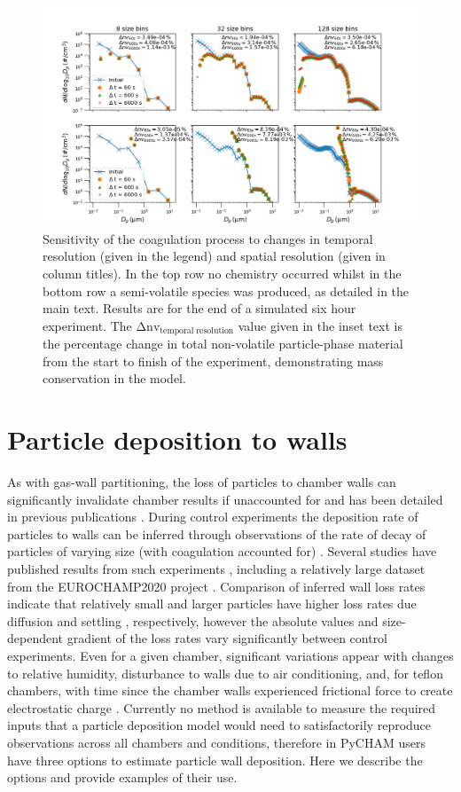 \documentclass[gmd, manuscript]{copernicus}
\begin{document}
\begin{figure}[t]
\includegraphics[width=12.0cm]{Results/coag_resol_test_plot.png}
\caption{Sensitivity of the coagulation process to changes in temporal resolution (given in the legend) and spatial resolution (given in column titles).  In the top row no chemistry occurred whilst in the bottom row a semi-volatile species was produced, as detailed in the main text.  Results are for the end of a simulated six hour experiment.  The $\mathrm{\Delta nv_{temporal\; resolution}}$ value given in the inset text is the percentage change in total non-volatile particle-phase material from the start to finish of the experiment, demonstrating mass conservation in the model.}
\label{fig:coag_resol_test_plot}
\end{figure}

\section{Particle deposition to walls}\label{sec:part2wall}

As with gas-wall partitioning, the loss of particles to chamber walls can significantly invalidate chamber results if unaccounted for and has been detailed in previous publications \citep{Crump1981, McMurry1985, Nah2017, Wang2018}.  During control experiments the deposition rate of particles to walls can be inferred through observations of the rate of decay of particles of varying size (with coagulation accounted for) \citep{Charan2019}.  Several studies have published results from such experiments \citep{McMurry1985, Wang2018}, including a relatively large dataset from the EUROCHAMP2020 project \citep{EUROCHAMP2020}.  Comparison of inferred wall loss rates indicate that relatively small and larger particles have higher loss rates due diffusion and settling \citep{Crump1981}, respectively, however the absolute values and size-dependent gradient of the loss rates vary significantly between control experiments.  Even for a given chamber, significant variations appear with changes to relative humidity, disturbance to walls due to air conditioning, and, for teflon chambers, with time since the chamber walls experienced frictional force to create electrostatic charge \citep{Wang2018}.  Currently no method is available to measure the required inputs that a particle deposition model would need to satisfactorily reproduce observations across all chambers and conditions, therefore in PyCHAM users have three options to estimate particle wall deposition.  Here we describe the options and provide examples of their use.
\end{document}
